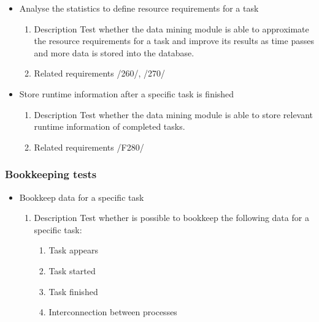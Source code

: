 {\begin{itemize}
				
				
				\item Analyse the statistics to define resource requirements for a task
				\begin{enumerate}
					\item Description\newline
Test whether the data mining module is able to approximate the resource requirements for a task and improve its results as time passes and more data is stored into the database.
					\item Related requirements\newline
					/260/, /270/
				\end{enumerate}
				
				
				
				\item Store runtime information after a specific task is finished
				\begin{enumerate}
					\item Description\newline
Test whether the data mining module is able to store relevant runtime information of completed tasks.
					\item Related requirements\newline
					/F280/
				\end{enumerate}
				
			
		\end{itemize}	
		\subsubsection{Bookkeeping tests}
		\begin{itemize}
		
		\item Bookkeep data for a specific task
				\begin{enumerate}
					\item Description\newline
Test whether is possible to bookkeep the following data for a specific task: 	
					\begin{enumerate}
					\item Task appears
					\item Task started
					\item Task finished 
					\item Interconnection between processes
					\end{enumerate}
					

\end{enumerate}
\end{itemize}}
